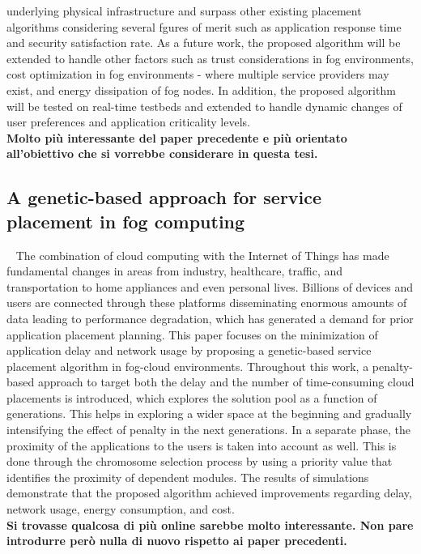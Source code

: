 underlying physical infrastructure and surpass other existing placement algorithms considering several fgures of merit such as application response time and security satisfaction rate.
As a future work, the proposed algorithm will be extended to handle other factors such as trust considerations in fog environments, cost optimization in fog environments - where
multiple service providers may exist, and energy dissipation of fog nodes. 
In addition, the proposed algorithm will be tested on real-time testbeds and extended to handle dynamic changes of user preferences and application criticality levels.\\
\textbf{Molto più interessante del paper precedente e più orientato all'obiettivo che si vorrebbe considerare in questa tesi.}


\subsection{A genetic-based approach for service placement in fog computing}~\cite{sarrafzade2022genetic}
The combination of cloud computing with the Internet of Things has made fundamental changes in areas from industry, healthcare, traffic, and transportation 
to home appliances and even personal lives. 
Billions of devices and users are connected through these platforms disseminating enormous amounts of data leading to performance degradation, 
which has generated a demand for prior application placement planning. 
This paper focuses on the minimization of application delay and network usage by proposing a genetic-based service placement algorithm in fog-cloud environments. 
Throughout this work, a penalty-based approach to target both the delay and the number of time-consuming cloud placements is introduced, 
which explores the solution pool as a function of generations. 
This helps in exploring a wider space at the beginning and gradually intensifying the effect of penalty in the next generations. 
In a separate phase, the proximity of the applications to the users is taken into account as well. 
This is done through the chromosome selection process by using a priority value that identifies the proximity of dependent modules. 
The results of simulations demonstrate that the proposed algorithm achieved improvements regarding delay, network usage, energy consumption, and cost.
\\
\textbf{Si trovasse qualcosa di più online sarebbe molto interessante. Non pare introdurre però nulla di nuovo rispetto ai paper precedenti.}


